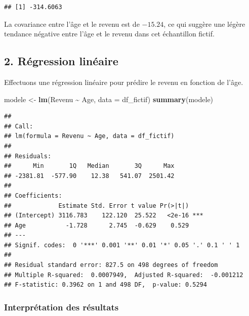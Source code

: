 \documentclass[
]{article}
\newenvironment{Shaded}{\begin{snugshade}}{\end{snugshade}}
\newcommand{\AttributeTok}[1]{\textcolor[rgb]{0.13,0.29,0.53}{#1}}
\newcommand{\FunctionTok}[1]{\textcolor[rgb]{0.13,0.29,0.53}{\textbf{#1}}}
\newcommand{\NormalTok}[1]{#1}
\newcommand{\OtherTok}[1]{\textcolor[rgb]{0.56,0.35,0.01}{#1}}
\newcommand{\SpecialCharTok}[1]{\textcolor[rgb]{0.81,0.36,0.00}{\textbf{#1}}}
\begin{document}
\begin{Shaded}
\end{Shaded}

\begin{verbatim}
## [1] -314.6063
\end{verbatim}

La covariance entre l'âge et le revenu est de \textbf{\(-15.24\)}, ce
qui suggère une légère tendance négative entre l'âge et le revenu dans
cet échantillon fictif.

\hypertarget{ruxe9gression-linuxe9aire}{%
\subsection{2. Régression linéaire}\label{ruxe9gression-linuxe9aire}}

Effectuons une régression linéaire pour prédire le revenu en fonction de
l'âge.

\begin{Shaded}
\begin{Highlighting}[]
\NormalTok{modele }\OtherTok{\textless{}{-}} \FunctionTok{lm}\NormalTok{(Revenu }\SpecialCharTok{\textasciitilde{}}\NormalTok{ Age, }\AttributeTok{data =}\NormalTok{ df\_fictif)}
\FunctionTok{summary}\NormalTok{(modele)}
\end{Highlighting}
\end{Shaded}

\begin{verbatim}
## 
## Call:
## lm(formula = Revenu ~ Age, data = df_fictif)
## 
## Residuals:
##      Min       1Q   Median       3Q      Max 
## -2381.81  -577.90    12.38   541.07  2501.42 
## 
## Coefficients:
##             Estimate Std. Error t value Pr(>|t|)    
## (Intercept) 3116.783    122.120  25.522   <2e-16 ***
## Age           -1.728      2.745  -0.629    0.529    
## ---
## Signif. codes:  0 '***' 0.001 '**' 0.01 '*' 0.05 '.' 0.1 ' ' 1
## 
## Residual standard error: 827.5 on 498 degrees of freedom
## Multiple R-squared:  0.0007949,  Adjusted R-squared:  -0.001212 
## F-statistic: 0.3962 on 1 and 498 DF,  p-value: 0.5294
\end{verbatim}

\hypertarget{interpruxe9tation-des-ruxe9sultats}{%
\subsubsection{Interprétation des
résultats}\label{interpruxe9tation-des-ruxe9sultats}}
\end{document}
